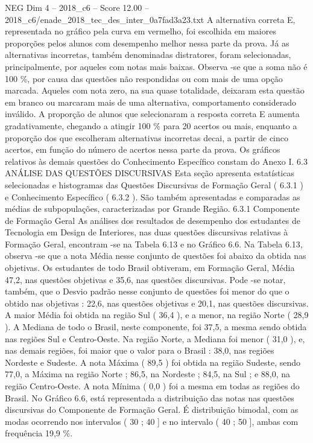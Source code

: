 \begin{textsample}{NEG Dim 4 – 2018\_c6 – Score 12.00 – 2018\_c6/enade\_2018\_tec\_des\_inter\_0a7fad3a23.txt}
A alternativa correta E, representada no gráfico pela curva em vermelho, foi escolhida em maiores proporções pelos alunos com desempenho melhor nessa parte da prova.
Já as alternativas incorretas, também denominadas distratores, foram selecionadas, principalmente, por aqueles com notas mais baixas.
Observa -se que a soma não é 100 \%, por causa das questões não respondidas ou com mais de uma opção marcada.
Aqueles com nota zero, na sua quase totalidade, deixaram esta questão em branco ou marcaram mais de uma alternativa, comportamento considerado inválido.
A proporção de alunos que selecionaram a resposta correta E aumenta gradativamente, chegando a atingir 100 \% para 20 acertos ou mais, enquanto a proporção dos que escolheram alternativas incorretas decai, a partir de cinco acertos, em função do número de acertos nessa parte da prova.
Os gráficos relativos às demais questões do Conhecimento Específico constam do Anexo I. 6.3 ANÁLISE DAS QUESTÕES DISCURSIVAS Esta seção apresenta estatísticas selecionadas e histogramas das Questões Discursivas de Formação Geral ( 6.3.1 ) e Conhecimento Específico ( 6.3.2 ).
São também apresentadas e comparadas as médias de subpopulações, caracterizadas por Grande Região. 6.3.1 Componente de Formação Geral As análises dos resultados de desempenho dos estudantes de Tecnologia em Design de Interiores, nas duas questões discursivas relativas à Formação Geral, encontram -se na Tabela 6.13 e no Gráfico 6.6.
Na Tabela 6.13, observa -se que a nota Média nesse conjunto de questões foi abaixo da obtida nas objetivas.
Os estudantes de todo Brasil obtiveram, em Formação Geral, Média 47,2, nas questões objetivas e 35,6, nas questões discursivas.
Pode -se notar, também, que o Desvio padrão nesse conjunto de questões foi menor do que o obtido nas objetivas : 22,6, nas questões objetivas e 20,1, nas questões discursivas.
A maior Média foi obtida na região Sul ( 36,4 ), e a menor, na região Norte ( 28,9 ).
A Mediana de todo o Brasil, neste componente, foi 37,5, a mesma sendo obtida nas regiões Sul e Centro-Oeste.
Na região Norte, a Mediana foi menor ( 31,0 ), e, nas demais regiões, foi maior que o valor para o Brasil : 38,0, nas regiões Nordeste e Sudeste.
A nota Máxima ( 89,5 ) foi obtida na região Sudeste, sendo 77,0, a Máxima na região Norte ; 86,5, na Nordeste ; 84,5, na Sul ; e 88,0, na região Centro-Oeste.
A nota Mínima ( 0,0 ) foi a mesma em todas as regiões do Brasil.
No Gráfico 6.6, está representada a distribuição das notas nas questões discursivas do Componente de Formação Geral.
É distribuição bimodal, com as modas ocorrendo nos intervalos ( 30 ; 40 ] e no intervalo ( 40 ; 50 ], ambas com frequência 19,9 \%.

\end{textsample}
